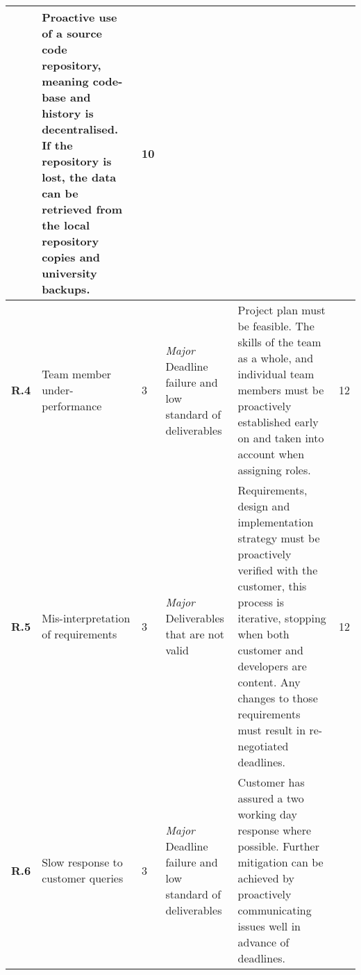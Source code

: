 \begin{longtable}[H]{| p{0.6cm} | p{2cm} | p{0.3cm} | p{2.6cm} | p{8.1cm} | p{0.7cm} |}
    & Proactive use of a source code repository, meaning code-base and history is decentralised. If the repository is lost, the data can be retrieved from the local repository copies and university backups.                                                                                                                                                                                                                                                                                                        
    & 10    \\ \hline
    \textbf{R.4}     & Team member under-performance                    & 3         & \textit{Major}
\newline Deadline failure and low standard  of deliverables            
    & Project plan must be feasible. The skills of the team as a whole, and individual team members must be proactively established early on and taken into account when assigning roles.                                                                                                                                                                                                                                                                                                                                                              
    & 12    \\ \hline
    \textbf{R.5}    & Mis-interpretation of requirements                & 3        & \textit{Major}
\newline Deliverables that are not valid                                        & 
    Requirements, design and implementation strategy must be proactively verified with the customer, this process is iterative, stopping when both customer and developers are content. Any changes to those requirements must result in re-negotiated deadlines.                                                                                                                                                                                                                                                                                    
    & 12    \\ \hline
    \textbf{R.6}    & Slow response to customer queries                & 3        & \textit{Major}
\newline Deadline failure and  low standard of deliverables         
    & Customer has assured a two working day response where possible. Further mitigation can be achieved by proactively communicating issues well in advance of deadlines.                                                                                                                                                                                                                                                                                                                                                                            

\end{longtable}
